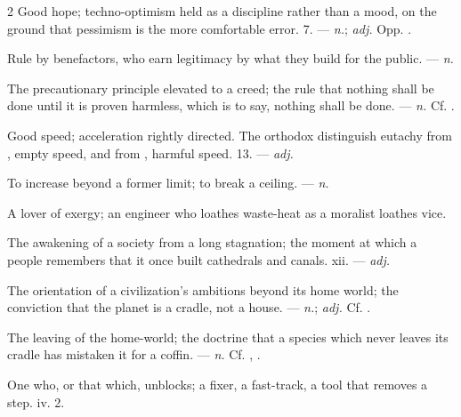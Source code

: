 \begin{multicols}{2}
 Good hope; techno-optimism held as a discipline rather than a mood, on the ground that pessimism is the more comfortable error.   7. —  \textit{n.};  \textit{adj.} Opp. .

 Rule by benefactors, who earn legitimacy by what they build for the public.
  —  \textit{n.}

 The precautionary principle elevated to a creed; the rule that nothing shall be done until it is proven harmless, which is to say, nothing shall be done. —  \textit{n.} Cf. .

 Good speed; acceleration rightly directed. The orthodox distinguish eutachy from , empty speed, and from , harmful speed.   13. —  \textit{adj.}

 To increase beyond a former limit; to break a ceiling.  —  \textit{n.}

 A lover of exergy; an engineer who loathes waste-heat as a moralist loathes vice.

 The awakening of a society from a long stagnation; the moment at which a people remembers that it once built cathedrals and canals.   xii. —  \textit{adj.}

 The orientation of a civilization's ambitions beyond its home world; the conviction that the planet is a cradle, not a house. —  \textit{n.};  \textit{adj.} Cf. .

 The leaving of the home-world; the doctrine that a species which never leaves its cradle has mistaken it for a coffin. —  \textit{n.} Cf. , .

 One who, or that which, unblocks; a fixer, a fast-track, a tool that removes a step.   iv. 2.

\end{multicols}

